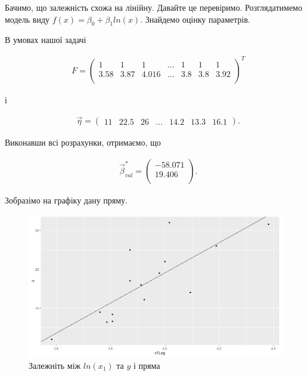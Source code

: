 \documentclass[14pt,a4paper]{scrartcl}
\theoremstyle{definition}
\theoremstyle{remark}
\theoremstyle{definition}
\theoremstyle{definition}
\begin{document}
Бачимо, що залежність схожа на лінійну. Давайте це перевіримо. Розглядатимемо модель виду $f(x) = \beta_{0} + \beta_{1} ln(x).$ Знайдемо оцінку параметрів.

В умовах нашої задачі

\begin{align*}
  & F = \begin{pmatrix}
    1 & 1 & 1 & ... & 1 & 1 & 1 \\
    3.58 & 3.87 & 4.016 & ... & 3.8 & 3.8 & 3.92 \\
  \end{pmatrix}^{T}
\end{align*}

і

\begin{align*}
  & \vec{\eta} =\begin{pmatrix}
    11 & 22.5 & 26 & ... & 14.2 & 13.3 & 16.1
  \end{pmatrix}.
\end{align*}

Виконавши всі розрахунки, отримаємо, що

\begin{align*}
  & \vec{\beta}^{*}_ {val} = \begin{pmatrix}
    -58.071  \\
    19.406  \\
  \end{pmatrix}.
\end{align*}

Зобразімо на графіку дану пряму.

\begin{figure}[H]
  \includegraphics[width=\linewidth]{Plot_x1Log_y_with_line.png}
  \caption{Залежніть між $ln(x_{1})$ та $y$ і пряма}
  \label{fig:image7}
\end{figure}
\end{document}

